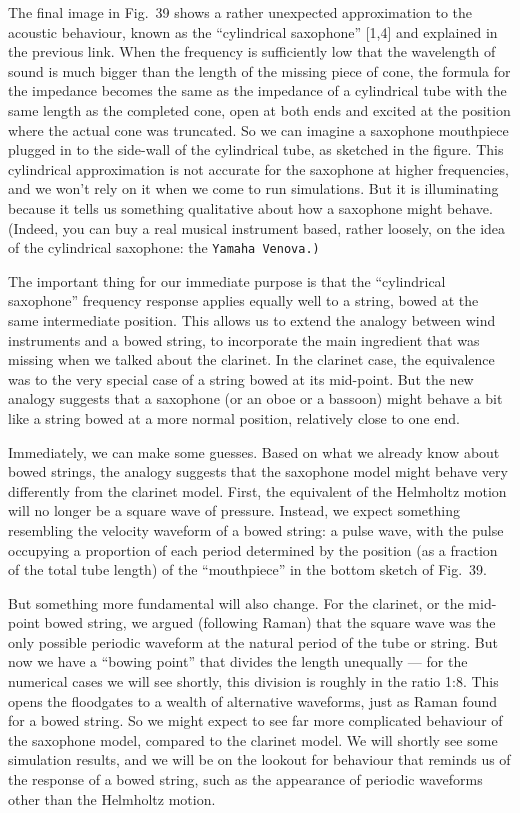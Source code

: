  The final image in Fig.\ 39 shows a rather unexpected approximation to the 
  acoustic behaviour, known as the “cylindrical saxophone” [1,4] and explained 
  in the previous link. When the frequency is sufficiently low that the 
  wavelength of sound is much bigger than the length of the missing piece of 
  cone, the formula for the impedance becomes the same as the impedance of a 
  cylindrical tube with the same length as the completed cone, open at both 
  ends and excited at the position where the actual cone was truncated. So we 
  can imagine a saxophone mouthpiece plugged in to the side-wall of the 
  cylindrical tube, as sketched in the figure. This cylindrical approximation 
  is not accurate for the saxophone at higher frequencies, and we won’t rely on 
  it when we come to run simulations. But it is illuminating because it tells 
  us something qualitative about how a saxophone might behave. (Indeed, you can 
  buy a real musical instrument based, rather loosely, on the idea of the 
  cylindrical saxophone: the \tt{}Yamaha Venova\rm{}.) 

  The important thing for our immediate purpose is that the “cylindrical 
  saxophone” frequency response applies equally well to a string, bowed at the 
  same intermediate position. This allows us to extend the analogy between wind 
  instruments and a bowed string, to incorporate the main ingredient that was 
  missing when we talked about the clarinet. In the clarinet case, the 
  equivalence was to the very special case of a string bowed at its mid-point. 
  But the new analogy suggests that a saxophone (or an oboe or a bassoon) might 
  behave a bit like a string bowed at a more normal position, relatively close 
  to one end. 

  Immediately, we can make some guesses. Based on what we already know about 
  bowed strings, the analogy suggests that the saxophone model might behave 
  very differently from the clarinet model. First, the equivalent of the 
  Helmholtz motion will no longer be a square wave of pressure. Instead, we 
  expect something resembling the velocity waveform of a bowed string: a pulse 
  wave, with the pulse occupying a proportion of each period determined by the 
  position (as a fraction of the total tube length) of the “mouthpiece” in the 
  bottom sketch of Fig.\ 39. 

  But something more fundamental will also change. For the clarinet, or the 
  mid-point bowed string, we argued (following Raman) that the square wave was 
  the only possible periodic waveform at the natural period of the tube or 
  string. But now we have a “bowing point” that divides the length unequally — 
  for the numerical cases we will see shortly, this division is roughly in the 
  ratio 1:8. This opens the floodgates to a wealth of alternative waveforms, 
  just as Raman found for a bowed string. So we might expect to see far more 
  complicated behaviour of the saxophone model, compared to the clarinet model. 
  We will shortly see some simulation results, and we will be on the lookout 
  for behaviour that reminds us of the response of a bowed string, such as the 
  appearance of periodic waveforms other than the Helmholtz motion. 

